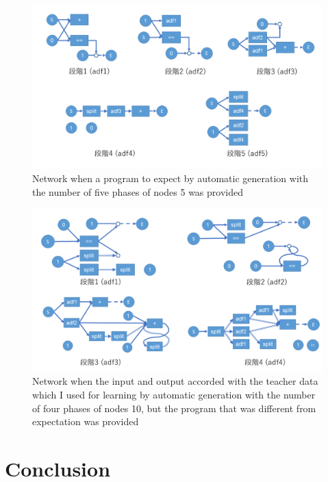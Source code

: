 \documentclass{article}
\begin{document}
\begin{figure}[t]
\begin{center}
\includegraphics[width=150mm]{out_net_p5n5.png}
\end{center}
\caption {Network when a program to expect by automatic generation with the number of five phases of nodes 5 was provided}
\label{fig:out_net_p5n5}
\end{figure}
\begin{figure}[t]
\begin{center}
\includegraphics[width=150mm]{out_net_p4n10.png}
\end{center}
\caption {Network when the input and output accorded with the teacher data which I used for learning by automatic generation with the number of four phases of nodes 10, but the program that was different from expectation was provided}
\label{fig:out_net_p4n10}
\end{figure}

\section {Conclusion}
\end{document}
